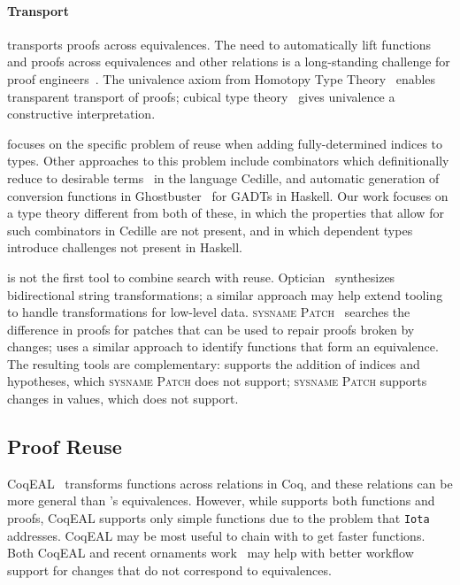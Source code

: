 \paragraph{Transport}

\toolnamec transports proofs across equivalences.
The need to automatically lift functions and proofs
across equivalences and other relations is a long-standing challenge for proof 
engineers~\cite{magaud2000changing, barthe2001type, magaud2003changing, huffman2013lifting, zimmermann2015automatic, cohen:hal-01414881}.
The univalence axiom from Homotopy Type Theory~\cite{univalent2013homotopy} enables transparent transport of proofs;
cubical type theory~\cite{cohen2016cubical} gives univalence a constructive interpretation. 


\toolnameb focuses on the specific problem of reuse
when adding fully-determined indices to types.
Other approaches to this problem include combinators which definitionally reduce to desirable terms~\cite{DBLP:journals/corr/abs-1803-08150} in the language Cedille,
and automatic generation of conversion functions in Ghostbuster~\cite{McDonell:2016:GTS:2951913.2951914} for GADTs in Haskell.
Our work focuses on a type theory different from both of these, in which the properties that allow for such combinators in Cedille are not present, and in which dependent types introduce challenges not present in Haskell.

\toolnameb is not the first tool to combine search with reuse. 
Optician~\cite{miltner2017synthesizing} synthesizes bidirectional string transformations;
a similar approach may help extend tooling to handle transformations for low-level data.
\textsc{sysname Patch}~\cite{ringer2018adapting} 
searches the difference in proofs for patches that can be used to repair proofs broken by changes;
\toolnameb uses a similar approach to identify functions
that form an equivalence. The resulting tools are complementary: \toolnameb supports the addition
of indices and hypotheses, which \textsc{sysname Patch} does not support; \textsc{sysname Patch} supports changes
in values, which \toolnameb does not support. 


\subsection*{Proof Reuse}


CoqEAL~\cite{cohen:hal-01113453} transforms functions across relations in Coq,
and these relations can be more general than \toolnamec's equivalences.
However, while \toolnamec supports both functions and proofs, CoqEAL supports only simple functions
due to the problem that \lstinline{Iota} addresses.
CoqEAL may be most useful to chain with \toolnamec to get faster functions.
Both CoqEAL and recent ornaments work~\cite{williamsphd} may help with
better workflow support for changes that do not correspond to equivalences.

